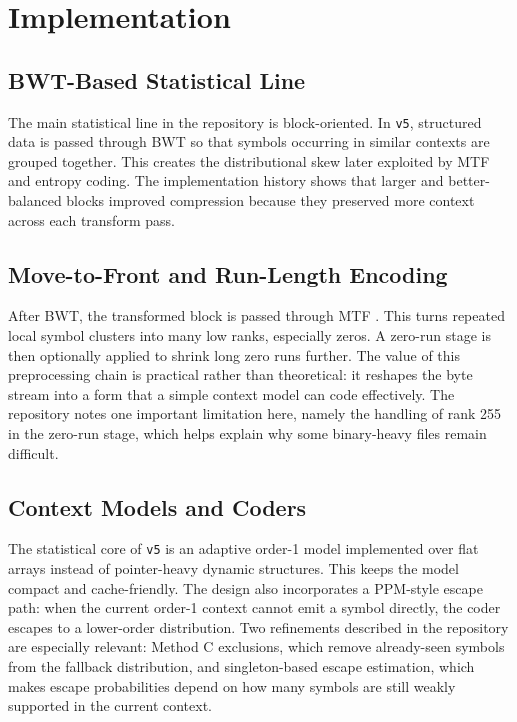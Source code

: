 \section{Implementation}
\label{sec:implementation}

\subsection{BWT-Based Statistical Line}
The main statistical line in the repository is block-oriented. In \texttt{v5}, structured data is passed through BWT so that symbols occurring in similar contexts are grouped together. This creates the distributional skew later exploited by MTF and entropy coding. The implementation history shows that larger and better-balanced blocks improved compression because they preserved more context across each transform pass.

\subsection{Move-to-Front and Run-Length Encoding}
After BWT, the transformed block is passed through MTF \cite{bentley1986}. This turns repeated local symbol clusters into many low ranks, especially zeros. A zero-run stage is then optionally applied to shrink long zero runs further. The value of this preprocessing chain is practical rather than theoretical: it reshapes the byte stream into a form that a simple context model can code effectively. The repository notes one important limitation here, namely the handling of rank 255 in the zero-run stage, which helps explain why some binary-heavy files remain difficult.

\subsection{Context Models and Coders}
The statistical core of \texttt{v5} is an adaptive order-1 model implemented over flat arrays instead of pointer-heavy dynamic structures. This keeps the model compact and cache-friendly. The design also incorporates a PPM-style escape path: when the current order-1 context cannot emit a symbol directly, the coder escapes to a lower-order distribution. Two refinements described in the repository are especially relevant: Method C exclusions, which remove already-seen symbols from the fallback distribution, and singleton-based escape estimation, which makes escape probabilities depend on how many symbols are still weakly supported in the current context.

